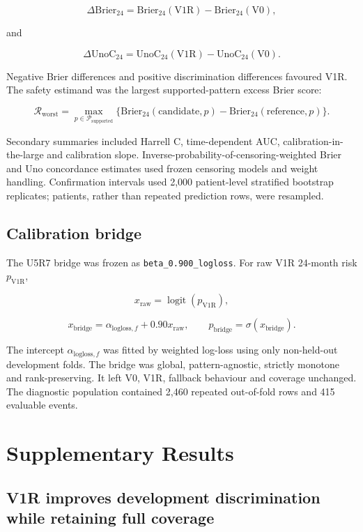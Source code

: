 \documentclass[pdflatex,sn-nature]{sn-jnl}
\begin{document}
\[
\Delta\mathrm{Brier}_{24}
=\mathrm{Brier}_{24}(\mathrm{V1R})-\mathrm{Brier}_{24}(\mathrm{V0}),
\]

and


\[
\Delta\mathrm{UnoC}_{24}
=\mathrm{UnoC}_{24}(\mathrm{V1R})-\mathrm{UnoC}_{24}(\mathrm{V0}).
\]

Negative Brier differences and positive discrimination differences favoured V1R. The safety estimand was the largest supported-pattern excess Brier score:


\[
\mathcal{R}_{\mathrm{worst}}
=\max_{p\in\mathcal{P}_{\mathrm{supported}}}
\{\mathrm{Brier}_{24}(\mathrm{candidate},p)-\mathrm{Brier}_{24}(\mathrm{reference},p)\}.
\]

Secondary summaries included Harrell C, time-dependent AUC, calibration-in-the-large and calibration slope. Inverse-probability-of-censoring-weighted Brier and Uno concordance estimates used frozen censoring models and weight handling. Confirmation intervals used 2,000 patient-level stratified bootstrap replicates; patients, rather than repeated prediction rows, were resampled.

\subsection*{Calibration bridge}

The U5R7 bridge was frozen as \texttt{beta\_0.900\_logloss}. For raw V1R 24-month risk \(p_{\mathrm{V1R}}\),


\[
x_{\mathrm{raw}}=\operatorname{logit}(p_{\mathrm{V1R}}),
\]


\[
x_{\mathrm{bridge}}=\alpha_{\mathrm{logloss},f}+0.90x_{\mathrm{raw}},
\qquad
p_{\mathrm{bridge}}=\sigma(x_{\mathrm{bridge}}).
\]

The intercept \(\alpha_{\mathrm{logloss},f}\) was fitted by weighted log-loss using only non-held-out development folds. The bridge was global, pattern-agnostic, strictly monotone and rank-preserving. It left V0, V1R, fallback behaviour and coverage unchanged. The diagnostic population contained 2,460 repeated out-of-fold rows and 415 evaluable events.

\section*{Supplementary Results}

\subsection*{V1R improves development discrimination while retaining full coverage}
\end{document}
